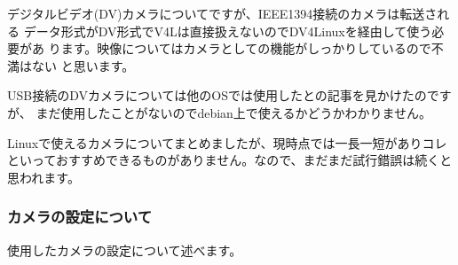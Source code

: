 \documentclass[mingoth,a4paper]{jsarticle}
\begin{document}
デジタルビデオ(DV)カメラについてですが、IEEE1394接続のカメラは転送される
データ形式がDV形式でV4Lは直接扱えないのでDV4Linuxを経由して使う必要があ
ります。映像についてはカメラとしての機能がしっかりしているので不満はない
と思います。


USB接続のDVカメラについては他のOSでは使用したとの記事を見かけたのですが、
まだ使用したことがないのでdebian上で使えるかどうかわかりません。


Linuxで使えるカメラについてまとめましたが、現時点では一長一短がありコレ
といっておすすめできるものがありません。なので、まだまだ試行錯誤は続くと
思われます。

\subsubsection{カメラの設定について}

使用したカメラの設定について述べます。
\end{document}
